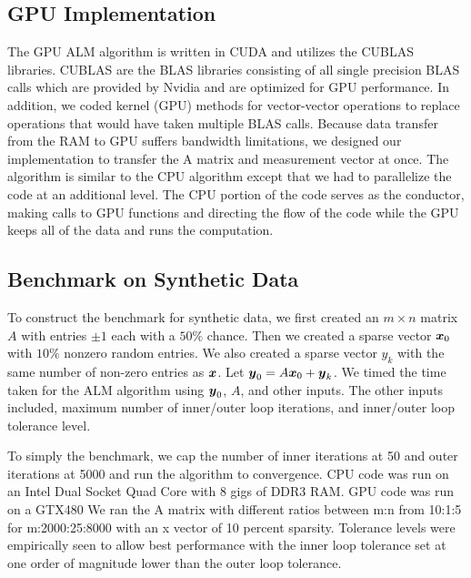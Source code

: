 \documentclass[10pt,twocolumn,letterpaper]{article}
\begin{document}

\subsection{ GPU Implementation}
The GPU ALM algorithm is written in CUDA and utilizes the CUBLAS libraries.
CUBLAS are the BLAS libraries consisting of all single precision BLAS calls
which are provided by Nvidia and are optimized for GPU performance. In
addition, we coded kernel (GPU) methods for vector-vector operations to replace
operations that would have taken multiple BLAS calls. Because data transfer from the RAM to GPU suffers bandwidth limitations, we designed our implementation to transfer the A matrix and measurement vector at once.  The algorithm is similar
to the CPU algorithm except that we had to parallelize the code at an
additional level. The CPU portion of the code serves as the conductor, making
calls to GPU functions and directing the flow of the code while the GPU keeps all of the data and runs the computation.

\subsection{Benchmark on Synthetic Data}

To construct the benchmark for synthetic data, we first created an $m \times n$
matrix $A$ with entries $\pm 1$ each with a $50\%$ chance.  Then we created a
sparse vector ${\boldsymbol{x}}_0$ with $10\%$ nonzero random entries.  We also created a
sparse vector $y_k$ with the same number of non-zero entries as ${\boldsymbol{x}}$.  Let
$\boldsymbol{y}_0 = A {\boldsymbol{x}}_0 + \boldsymbol{y}_k$.  We timed the time taken for the ALM algorithm using
$\boldsymbol{y}_0$, $A$, and other inputs.  The other inputs included, maximum number of
inner/outer loop iterations, and inner/outer loop tolerance level.

To simply the benchmark, we cap the number of inner iterations at 50 and outer iterations
at 5000 and run the algorithm to convergence.  CPU code was run on an Intel
Dual Socket Quad Core with 8 gigs of DDR3 RAM.  GPU code was run on a GTX480 We
ran the A matrix with different ratios between m:n from 10:1:5 for m:2000:25:8000 with an x vector of 10 percent sparsity.  Tolerance levels were
empirically seen to allow best performance with the inner loop tolerance set at
one order of magnitude lower than the outer loop tolerance.
\end{document}
